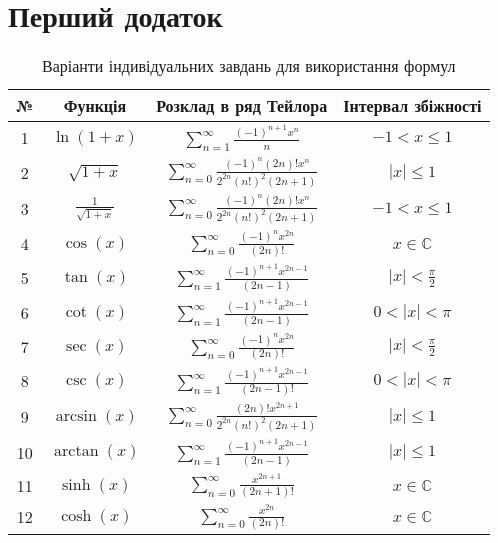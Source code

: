 	\section{Перший додаток}\label{sec:appendix1}
	\begin{table}[h!]
		\centering
		\caption{Варіанти індивідуальних завдань для використання формул}
		\label{tab:taylor_series}
		\begin{tabular}{|c|c||c||c|}
			\hline
			№ & Функція & Розклад в ряд Тейлора & Інтервал збіжності \\
			\hline
			\hline
			1 & \( \ln(1+x) \) & \( \displaystyle\sum_{n=1}^{\infty} \frac{(-1)^{n+1} x^n}{n} \) & \( -1 < x \leq 1 \) \\
			\hline
			2 & \( \sqrt{1+x} \) & \( \displaystyle\sum_{n=0}^{\infty} \frac{(-1)^n (2n)! x^n}{2^{2n} (n!)^2 (2n+1)} \) & \( |x| \leq 1 \) \\
			\hline
			3 & \( \frac{1}{\sqrt{1+x}} \) & \( \displaystyle\sum_{n=0}^{\infty} \frac{(-1)^n (2n)! x^n}{2^{2n} (n!)^2 (2n+1)} \) & \( -1 < x \leq 1 \) \\
			\hline
			4 & \( \cos(x) \) & \( \displaystyle\sum_{n=0}^{\infty} \frac{(-1)^n x^{2n}}{(2n)!} \) & \( x \in \mathbb{C} \) \\
			\hline
			5 & \( \tan(x) \) & \( \displaystyle\sum_{n=1}^{\infty} \frac{(-1)^{n+1} x^{2n-1}}{(2n-1)} \) & \( |x| < \frac{\pi}{2} \) \\
			\hline
			6 & \( \cot(x) \) & \( \displaystyle\sum_{n=1}^{\infty} \frac{(-1)^{n+1} x^{2n-1}}{(2n-1)} \) & \( 0 < |x| < \pi \) \\
			\hline
			7 & \( \sec(x) \) & \( \displaystyle\sum_{n=0}^{\infty} \frac{(-1)^n x^{2n}}{(2n)!} \) & \( |x| < \frac{\pi}{2} \) \\
			\hline
			8 & \( \csc(x) \) & \( \displaystyle\sum_{n=1}^{\infty} \frac{(-1)^{n+1} x^{2n-1}}{(2n-1)!} \) & \( 0 < |x| < \pi \) \\
			\hline
			9 & \( \arcsin(x) \) & \( \displaystyle\sum_{n=0}^{\infty} \frac{(2n)! x^{2n+1}}{2^{2n} (n!)^2 (2n+1)} \) & \( |x| \leq 1 \) \\
			\hline
			10 & \( \arctan(x) \) & \( \displaystyle\sum_{n=1}^{\infty} \frac{(-1)^{n+1} x^{2n-1}}{(2n-1)} \) & \( |x| \leq 1 \) \\
			\hline
			11 & \( \sinh(x) \) & \( \displaystyle\sum_{n=0}^{\infty} \frac{x^{2n+1}}{(2n+1)!} \) & \( x \in \mathbb{C} \) \\
			\hline
			12 & \( \cosh(x) \) & \( \displaystyle\sum_{n=0}^{\infty} \frac{x^{2n}}{(2n)!} \) & \( x \in \mathbb{C} \) \\

\end{tabular}
\end{table}
